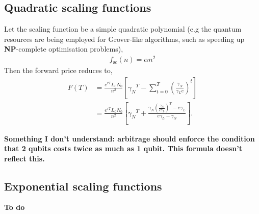 \documentclass[aps,pra,twocolumn,amsmath,amssymb,nofootinbib,superscriptaddress]{revtex4}
\begin{document}
\subsection{Quadratic scaling functions}

Let the scaling function be a simple quadratic polynomial (e.g the quantum resources are being employed for Grover-like algorithms, such as speeding up \textbf{NP}-complete optimisation problems),
\begin{align}
f_\text{sc}(n) = \alpha n^2	
\end{align}
Then the forward price reduces to,
\begin{align}
F(T) &= \frac{e^{rT}L_0N_0}{n^2} \left[{\gamma_N}^{T} - \sum_{t=0}^{T} \left(\frac{\gamma_N}{\gamma_L e}\right)^t \right] \nonumber \\
&= \frac{e^{rT}L_0 N_0}{n^2} \left[{\gamma_N}^T + \frac{\gamma_N\left(\frac{\gamma_N}{e \gamma_L}\right)^T-e\gamma_L}{e\gamma_L - \gamma_N} \right].
\end{align}

\textbf{Something I don't understand: arbitrage should enforce the condition that 2 qubits costs twice as much as 1 qubit. This formula doesn't reflect this.}

\subsection{Exponential scaling functions}

\textbf{To do}
\end{document}
